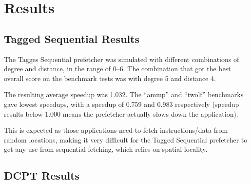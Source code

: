 \section{Results}

\subsection{Tagged Sequential Results}

The Tagges Sequential prefetcher was simulated with different combinations of
degree and distance, in the range of 0--6. The combination that got the best
overall score on the benchmark tests was with degree 5 and distance 4.

The resulting average speedup was 1.032. The ``ammp'' and ``twolf'' benchmarks
gave lowest speedups, with a speedup of 0.759 and 0.983 respectively (speedup
results below 1.000 means the prefetcher actually slows down the application).

This is expected as those applications need to fetch instructions/data from random locations, making it very difficult for the Tagged Sequential prefetcher to get any use from sequential fetching, which relies on spatial locality.

\subsection{DCPT Results}

